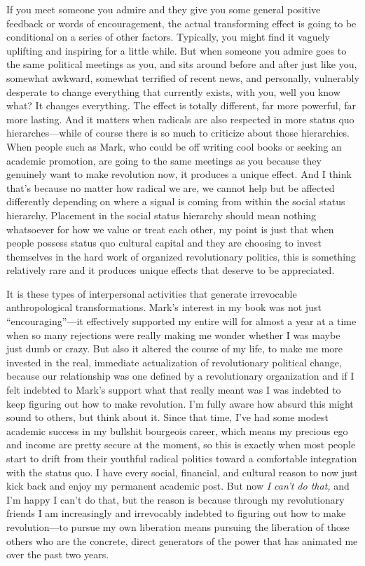 \documentclass[a4paper,12pt,margin=.5in]{article}
\begin{document}
If you meet someone you admire and they give you some general positive
feedback or words of encouragement, the actual transforming effect is
going to be conditional on a series of other factors. Typically, you
might find it vaguely uplifting and inspiring for a little while. But
when someone you admire goes to the same political meetings as you, and
sits around before and after just like you, somewhat awkward, somewhat
terrified of recent news, and personally, vulnerably desperate to change
everything that currently exists, with you, well you know what? It
changes everything. The effect is totally different, far more powerful,
far more lasting. And it matters when radicals are also respected in
more status quo hierarches---while of course there is so much to
criticize about those hierarchies. When people such as Mark, who could
be off writing cool books or seeking an academic promotion, are going to
the same meetings as you because they genuinely want to make revolution
now, it produces a unique effect. And I think that's because no matter
how radical we are, we cannot help but be affected differently depending
on where a signal is coming from within the social status hierarchy.
Placement in the social status hierarchy should mean nothing whatsoever
for how we value or treat each other, my point is just that when people
possess status quo cultural capital and they are choosing to invest
themselves in the hard work of organized revolutionary politics, this is
something relatively rare and it produces unique effects that deserve to
be appreciated.

It is these types of interpersonal activities that generate irrevocable
anthropological transformations. Mark's interest in my book was not just
``encouraging''---it effectively supported my entire will for almost a
year at a time when so many rejections were really making me wonder
whether I was maybe just dumb or crazy. But also it altered the course
of my life, to make me more invested in the real, immediate
actualization of revolutionary political change, because our
relationship was one defined by a revolutionary organization and if I
felt indebted to Mark's support what that really meant was I was
indebted to keep figuring out how to make revolution. I'm fully aware
how absurd this might sound to others, but think about it. Since that
time, I've had some modest academic success in my bullshit bourgeois
career, which means my precious ego and income are pretty secure at the
moment, so this is exactly when most people start to drift from their
youthful radical politics toward a comfortable integration with the
status quo. I have every social, financial, and cultural reason to now
just kick back and enjoy my permanent academic post. But now \emph{I
can't do that,} and I'm happy I can't do that, but the reason is because
through my revolutionary friends I am increasingly and irrevocably
indebted to figuring out how to make revolution---to pursue my own
liberation means pursuing the liberation of those others who are the
concrete, direct generators of the power that has animated me over the
past two years.
\end{document}
